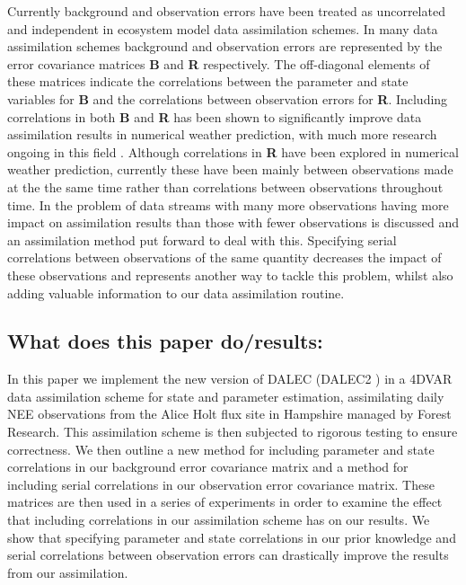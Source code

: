 \documentclass[11pt]{article}
\begin{document}
Currently background and observation errors have been treated as uncorrelated and independent in ecosystem model data assimilation schemes. In many data assimilation schemes background and observation errors are represented by the error covariance matrices \textbf{B} and \textbf{R} respectively. The off-diagonal elements of these matrices indicate the correlations between the parameter and state variables for \textbf{B} and the correlations between observation errors for \textbf{R}. Including correlations in both \textbf{B} and \textbf{R} has been shown to significantly improve data assimilation results in numerical weather prediction, with much more research ongoing in this field \citep{fisher2003background, Stewart2013}. Although correlations in \textbf{R} have been explored in numerical weather prediction, currently these have been mainly between observations made at the the same time rather than correlations between observations throughout time. In \citet{richardson2010estimating} the problem of data streams with many more observations having more impact on assimilation results than those with fewer observations is discussed and an assimilation method put forward to deal with this. Specifying serial correlations between observations of the same quantity decreases the impact of these observations \citep{jarvinen1999variational} and represents another way to tackle this problem, whilst also adding valuable information to our data assimilation routine. 

\subsection{What does this paper do/results:}
In this paper we implement the new version of DALEC (DALEC2 \citep{Bloom2015}) in a 4DVAR data assimilation scheme for state and parameter estimation, assimilating daily NEE observations from the Alice Holt flux site in Hampshire managed by Forest Research. This assimilation scheme is then subjected to rigorous testing to ensure correctness. We then outline a new method for including parameter and state correlations in our background error covariance matrix and a method for including serial correlations in our observation error covariance matrix. These matrices are then used in a series of experiments in order to examine the effect that including correlations in our assimilation scheme has on our results. We show that specifying parameter and state correlations in our prior knowledge and serial correlations between observation errors can drastically improve the results from our assimilation.
\end{document}
